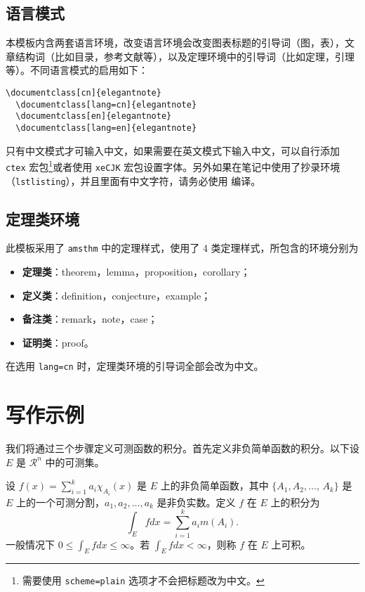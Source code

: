 \documentclass[cn,hazy,blue,screen,14pt]{elegantnote}
\begin{document}
\subsection{语言模式}

本模板内含两套语言环境，改变语言环境会改变图表标题的引导词（图，表），文章结构词（比如目录，参考文献等），以及定理环境中的引导词（比如定理，引理等）。不同语言模式的启用如下：
\begin{lstlisting}[frame=none]  
  \documentclass[cn]{elegantnote} 
  \documentclass[lang=cn]{elegantnote} 
  \documentclass[en]{elegantnote} 
  \documentclass[lang=en]{elegantnote}
\end{lstlisting}

\begin{note}
只有中文模式才可输入中文，如果需要在英文模式下输入中文，可以自行添加 \lstinline{ctex} 宏包\footnote{需要使用 \lstinline{scheme=plain} 选项才不会把标题改为中文。}或者使用 \lstinline{xeCJK} 宏包设置字体。另外如果在笔记中使用了抄录环境（\lstinline{lstlisting}），并且里面有中文字符，请务必使用  编译。
\end{note}


\subsection{定理类环境}

此模板采用了 \lstinline{amsthm} 中的定理样式，使用了 4 类定理样式，所包含的环境分别为
\begin{itemize}
  \item \textbf{定理类}：theorem，lemma，proposition，corollary；
  \item \textbf{定义类}：definition，conjecture，example；
  \item \textbf{备注类}：remark，note，case；
  \item \textbf{证明类}：proof。
\end{itemize}

\begin{remark}
在选用 \lstinline{lang=cn} 时，定理类环境的引导词全部会改为中文。
\end{remark}


\section{写作示例}

我们将通过三个步骤定义可测函数的积分。首先定义非负简单函数的积分。以下设 $E$ 是 $\mathcal{R}^n$ 中的可测集。

\begin{definition}[可积性]
设 $ f(x)=\sum\limits_{i=1}^{k} a_i \chi_{A_i}(x)$ 是 $E$ 上的非负简单函数，其中 $\{A_1,A_2,\ldots$, $A_k\}$ 是 $E$ 上的一个可测分割，$a_1,a_2,\ldots,a_k$ 是非负实数。定义 $f$ 在 $E$ 上的积分为
\begin{equation}
   \label{inter}
   \int_{E} f dx = \sum_{i=1}^k a_i m(A_i).
\end{equation}
一般情况下 $0 \leq \int_{E} f dx \leq \infty$。若 $\int_{E} f dx < \infty$，则称 $f$ 在 $E$ 上可积。
\end{definition}
\end{document}
